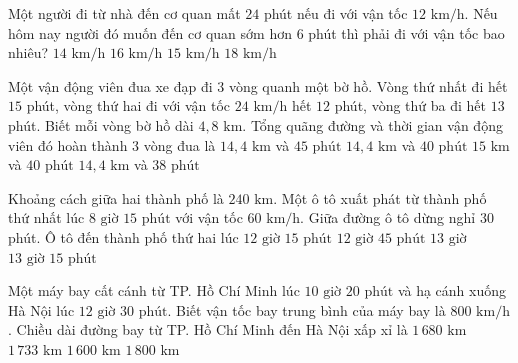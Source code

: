 \begin{ex} %
Một người đi từ nhà đến cơ quan mất $24$ phút nếu đi với vận tốc $12\text{ km/h}$. Nếu hôm nay người đó muốn đến cơ quan sớm hơn $6$ phút thì phải đi với vận tốc bao nhiêu?
\choice
{$14\text{ km/h}$}
{\True $16\text{ km/h}$}
{$15\text{ km/h}$}
{$18\text{ km/h}$}
\end{ex}

\begin{ex} %
Một vận động viên đua xe đạp đi $3$ vòng quanh một bờ hồ. Vòng thứ nhất đi hết $15$ phút, vòng thứ hai đi với vận tốc $24\text{ km/h}$ hết $12$ phút, vòng thứ ba đi hết $13$ phút. Biết mỗi vòng bờ hồ dài $4{,}8\text{ km}$. Tổng quãng đường và thời gian vận động viên đó hoàn thành $3$ vòng đua là
\choice
{$14{,}4\text{ km}$ và $45\text{ phút}$}
{\True $14{,}4\text{ km}$ và $40\text{ phút}$}
{$15\text{ km}$ và $40\text{ phút}$}
{$14{,}4\text{ km}$ và $38\text{ phút}$}
\end{ex}

\begin{ex} %
Khoảng cách giữa hai thành phố là $240\text{ km}$. Một ô tô xuất phát từ thành phố thứ nhất lúc $8\text{ giờ } 15\text{ phút}$ với vận tốc $60\text{ km/h}$. Giữa đường ô tô dừng nghỉ $30$ phút. Ô tô đến thành phố thứ hai lúc
\choice
{$12\text{ giờ } 15\text{ phút}$}
{\True $12\text{ giờ } 45\text{ phút}$}
{$13\text{ giờ}$}
{$13\text{ giờ } 15\text{ phút}$}
\end{ex}

\begin{ex} %
Một máy bay cất cánh từ TP. Hồ Chí Minh lúc $10\text{ giờ } 20\text{ phút}$ và hạ cánh xuống Hà Nội lúc $12\text{ giờ } 30\text{ phút}$. Biết vận tốc bay trung bình của máy bay là $800\text{ km/h}$. Chiều dài đường bay từ TP. Hồ Chí Minh đến Hà Nội xấp xỉ là
\choice
{$1\,680\text{ km}$}
{\True $1\,733\text{ km}$}
{$1\,600\text{ km}$}
{$1\,800\text{ km}$}
\end{ex}

